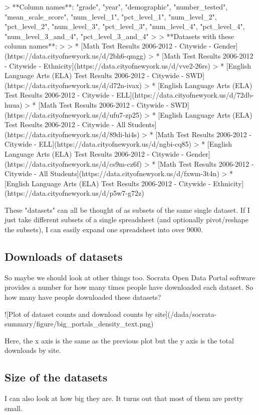 \documentclass{acm_proc_article-sp}
\begin{document}
> **Column names**: "grade", "year", "demographic", "number_tested", "mean_scale_score", "num_level_1", "pct_level_1", "num_level_2", "pct_level_2", "num_level_3", "pct_level_3", "num_level_4", "pct_level_4", "num_level_3_and_4", "pct_level_3_and_4"
>
> **Datasets with these column names**:
>
> * [Math Test Results 2006-2012 - Citywide - Gender](https://data.cityofnewyork.us/d/2bh6-qmgg)
> * [Math Test Results 2006-2012 - Citywide - Ethnicity](https://data.cityofnewyork.us/d/vve2-26rs)
> * [English Language Arts (ELA) Test Results 2006-2012 - Citywide - SWD](https://data.cityofnewyork.us/d/d72n-ivax)
> * [English Language Arts (ELA) Test Results 2006-2012 - Citywide - ELL](https://data.cityofnewyork.us/d/72db-huua)
> * [Math Test Results 2006-2012 - Citywide - SWD](https://data.cityofnewyork.us/d/ufu7-zp25)
> * [English Language Arts (ELA) Test Results 2006-2012 - Citywide - All Students](https://data.cityofnewyork.us/d/89di-hi4s)
> * [Math Test Results 2006-2012 - Citywide - ELL](https://data.cityofnewyork.us/d/ngbi-cq85)
> * [English Language Arts (ELA) Test Results 2006-2012 - Citywide - Gender](https://data.cityofnewyork.us/d/cs9m-cz6f)
> * [Math Test Results 2006-2012 - Citywide - All Students](https://data.cityofnewyork.us/d/fxwm-3t4n)
> * [English Language Arts (ELA) Test Results 2006-2012 - Citywide - Ethnicity](https://data.cityofnewyork.us/d/p5w7-g72z)

These "datasets" can all be thought of as subsets of the same single dataset.
If I just take different subsets of a single spreadsheet (and optionally
pivot/reshape the subsets), I can easily expand one spreadsheet into over 9000.

\subsection{Downloads of datasets}
So maybe we should look at other things too.
Socrata Open Data Portal software provides a number for
how many times people have downloaded each dataset.
So how many have people downloaded these datasets?

![Plot of dataset counts and download counts by site](/dada/socrata-summary/figure/big_portals_density_text.png)

Here, the x axis is the same as the previous plot but the y axis is the total
downloads by site.

\subsection{Size of the datasets}
I can also look at how big they are.
It turns out that most of them are pretty small.
\end{document}
